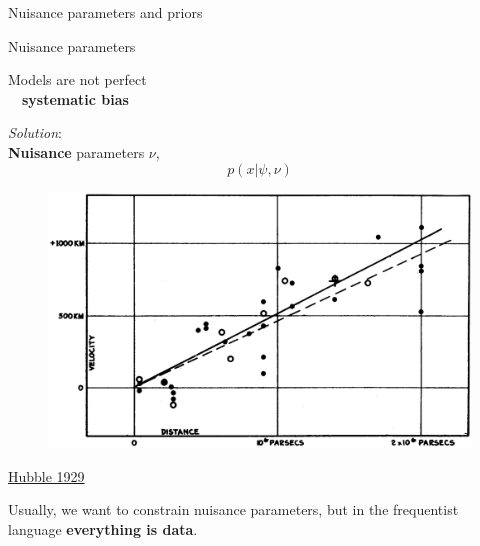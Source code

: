 \documentclass[
aspectratio=169,
14pt,
professionalfonts
]{beamer}
\newcommand{\arrow}{~\ding{220}~}
\begin{document}
\begin{frame}
    \center
    \Large
    Nuisance parameters and priors
    \end{frame}
    
    \begin{frame}{Nuisance parameters}

        \begin{minipage}{0.49\textwidth}
            Models are not perfect \\
            \arrow \textbf{systematic bias}

            \vspace{0.5cm}
            \textit{Solution}: \\
            \textbf{Nuisance} parameters $\nu$,
            $$p(x|\psi, \nu)$$
        \end{minipage}
        \begin{minipage}{0.49\textwidth}
            \begin{figure}
                \centering
                \includegraphics[width=\textwidth]{../plots/hubble.png}
            \end{figure}
            \flushright \small
            \href{https://www.pnas.org/doi/10.1073/pnas.15.3.168}{Hubble 1929}
        \end{minipage}
    \vspace{0.5cm}
    
    
    Usually, we want to constrain nuisance parameters, but in the frequentist language \textbf{everything is data}.
    
\end{frame}
    
\end{document}
